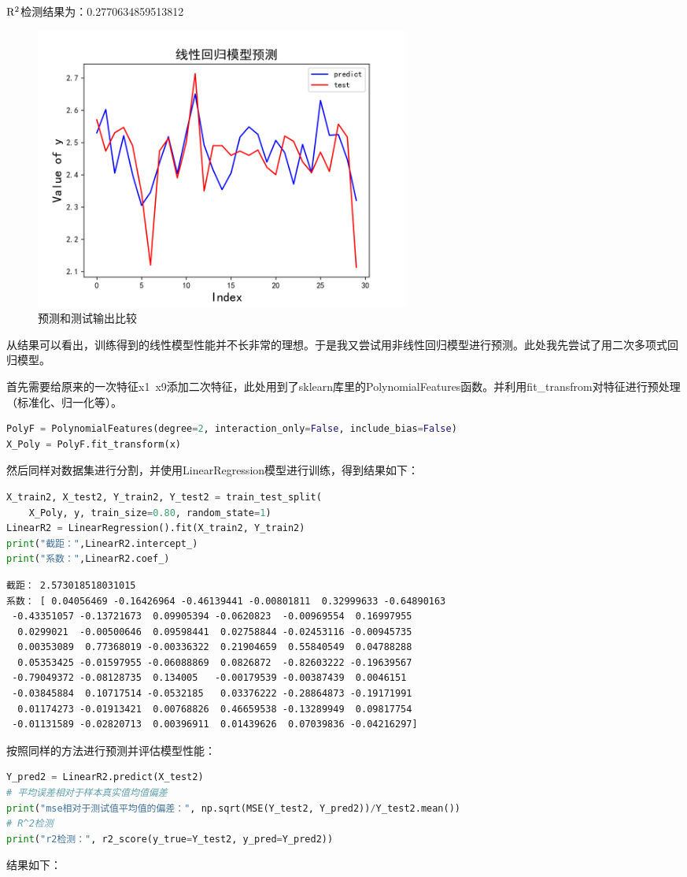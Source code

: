 \documentclass{source/Experiment}
\begin{document}
$\rm R^2$检测结果为：0.2770634859513812

\begin{figure}[H]
    \centering
    \includegraphics[width = 0.6\textwidth]{LinearR}
    \caption{预测和测试输出比较}
\end{figure}

从结果可以看出，训练得到的线性模型性能并不长非常的理想。于是我又尝试用非线性回归模型进行预测。此处我先尝试了用二次多项式回归模型。

首先需要给原来的一次特征x1~x9添加二次特征，此处用到了sklearn库里的PolynomialFeatures函数。并利用fit\_transfrom对特征进行预处理（标准化、归一化等）。
\begin{lstlisting}[language=Python]
PolyF = PolynomialFeatures(degree=2, interaction_only=False, include_bias=False)
X_Poly = PolyF.fit_transform(x)
            \end{lstlisting}
然后同样对数据集进行分割，并使用LinearRegression模型进行训练，得到结果如下：
\begin{lstlisting}[language=Python]
X_train2, X_test2, Y_train2, Y_test2 = train_test_split(
    X_Poly, y, train_size=0.80, random_state=1)
LinearR2 = LinearRegression().fit(X_train2, Y_train2)
print("截距：",LinearR2.intercept_)
print("系数：",LinearR2.coef_)
            \end{lstlisting}
\begin{lstlisting}
截距： 2.573018518031015
系数： [ 0.04056469 -0.16426964 -0.46139441 -0.00801811  0.32999633 -0.64890163
 -0.43351057 -0.13721673  0.09905394 -0.0620823  -0.00969554  0.16997955
  0.0299021  -0.00500646  0.09598441  0.02758844 -0.02453116 -0.00945735
  0.00353089  0.77368019 -0.00336322  0.21904659  0.55840549  0.04788288
  0.05353425 -0.01597955 -0.06088869  0.0826872  -0.82603222 -0.19639567
 -0.79049372 -0.08128735  0.134005   -0.00179539 -0.00387439  0.0046151
 -0.03845884  0.10717514 -0.0532185   0.03376222 -0.28864873 -0.19171991
  0.01174273 -0.01913421  0.00768826  0.46659538 -0.13289949  0.09817754
 -0.01131589 -0.02820713  0.00396911  0.01439626  0.07039836 -0.04216297]
\end{lstlisting}
按照同样的方法进行预测并评估模型性能：
\begin{lstlisting}[language=Python]
Y_pred2 = LinearR2.predict(X_test2)
# 平均误差相对于样本真实值均值偏差
print("mse相对于测试值平均值的偏差：", np.sqrt(MSE(Y_test2, Y_pred2))/Y_test2.mean())
# R^2检测
print("r2检测：", r2_score(y_true=Y_test2, y_pred=Y_pred2))
            \end{lstlisting}
结果如下：
\end{document}
